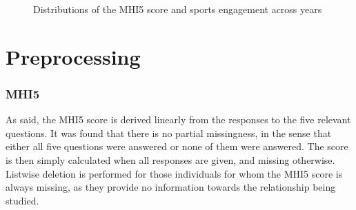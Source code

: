 \begin{figure}[htbp]
    \begin{subfigure}[t]{0.49\textwidth}
        \centering
        
        \vspace{0.1em}
        \label{fig:data:sample_moments_y_x:y}
    \end{subfigure}
    \hfill
    \begin{subfigure}[t]{0.49\textwidth}
        \centering
        
        \vspace{0.1em}
        \label{fig:data:sample_moments_y_x:x}
    \end{subfigure}
    \caption{Distributions of the MHI5 score and sports engagement across years}
    \label{fig:data:sample_moments_y_x}
\end{figure}

\section{Preprocessing}
\label{sec:data:preprocessing}
\subsubsection{MHI5}
As said, the MHI5 score is derived linearly from the responses to the five relevant questions. It was found that
there is no partial missingness, in the sense that either all five questions were answered or none of them were answered.
The score is then simply calculated when all responses are given, and missing otherwise.
Listwise deletion is performed for those individuals for whom the MHI5 score is always missing, as they provide no
information towards the relationship being studied.

